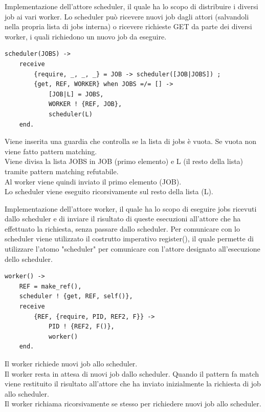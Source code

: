 \documentclass{article}
\begin{document}
Implementazione dell'attore scheduler, il quale ha lo scopo di distribuire i diversi job ai vari worker. Lo scheduler può ricevere nuovi job dagli attori (salvandoli nella propria lista di jobs interna) o ricevere richieste GET da parte dei diversi worker, i quali richiedono un nuovo job da eseguire.
\begin{tcolorbox}
\begin{verbatim}
scheduler(JOBS) -> 
    receive
        {require, _, _, _} = JOB -> scheduler([JOB|JOBS]) ;
        {get, REF, WORKER} when JOBS =/= [] ->                  
            [JOB|L] = JOBS,                                     
            WORKER ! {REF, JOB},                                
            scheduler(L)                                        
    end.
\end{verbatim}
\end{tcolorbox}
Viene inserita una guardia che controlla se la lista di jobs è vuota. Se vuota non viene fatto pattern matching.\\
Viene divisa la lista JOBS in JOB (primo elemento) e L (il resto della lista) tramite pattern matching refutabile.\\
Al worker viene quindi inviato il primo elemento (JOB).\\
Lo scheduler viene eseguito ricorsivamente sul resto della lista (L).

Implementazione dell'attore worker, il quale ha lo scopo di eseguire jobs ricevuti dallo scheduler e di inviare il risultato di queste esecuzioni all'attore che ha effettuato la richiesta, senza passare dallo scheduler. Per comunicare con lo scheduler viene utilizzato il costrutto imperativo register(), il quale permette di utilizzare l'atomo "scheduler" per comunicare con l'attore designato all'esecuzione dello scheduler.
\begin{tcolorbox}
\begin{verbatim}
worker() ->
    REF = make_ref(),
    scheduler ! {get, REF, self()},                             
    receive 
        {REF, {require, PID, REF2, F}} ->                       
            PID ! {REF2, F()},                                  
            worker()                                            
    end.
\end{verbatim}
\end{tcolorbox}
Il worker richiede nuovi job allo scheduler.\\
Il worker resta in attesa di nuovi job dallo scheduler. Quando il pattern fa match viene restituito il risultato all'attore che ha inviato inizialmente la richiesta di job allo scheduler.\\
Il worker richiama ricorsivamente se stesso per richiedere nuovi job allo scheduler.
\end{document}
